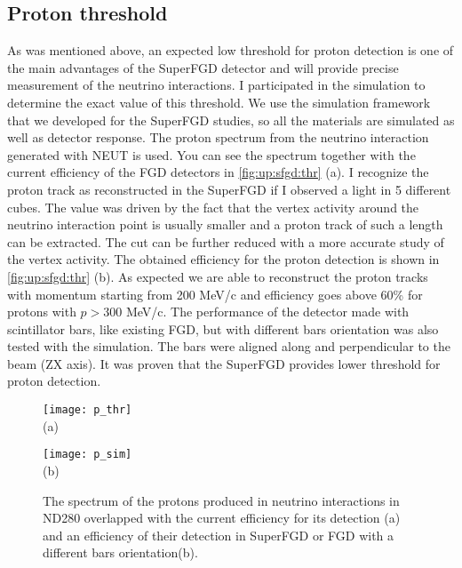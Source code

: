 \documentclass[main.tex]{subfiles}
\begin{document}
\subsection{Proton threshold}
\label{sec:up:sfgd:thr}
As was mentioned above, an expected low threshold for proton detection is one of the main advantages of the SuperFGD detector and will provide precise measurement of the neutrino interactions. I participated in the simulation to determine the exact value of this threshold. We use the simulation framework that we developed for the SuperFGD studies, so all the materials are simulated as well as detector response. The proton spectrum from the neutrino interaction generated with NEUT is used. You can see the spectrum together with the current efficiency of the FGD detectors in \autoref{fig:up:sfgd:thr} (a). I recognize the proton track as reconstructed in the SuperFGD if I observed a light in 5 different cubes. The value was driven by the fact that the vertex activity around the neutrino interaction point is usually smaller and a proton track of such a length can be extracted. The cut can be further reduced with a more accurate study of the vertex activity. The obtained efficiency for the proton detection is shown in \autoref{fig:up:sfgd:thr} (b). As expected we are able to reconstruct the proton tracks with momentum starting from 200 MeV/c and efficiency goes above 60\% for protons with $p>300$ MeV/c. The performance of the detector made with scintillator bars, like existing FGD, but with different bars orientation was also tested with the simulation. The bars were aligned along and perpendicular to the beam (ZX axis). It was proven that the SuperFGD provides lower threshold for proton detection.

\begin{figure}[!ht]
	\centering
  \begin{minipage}{0.49\linewidth}
    \centering
    \texttt{[image: p\_thr]} \\ (a)
  \end{minipage}
  \begin{minipage}{0.49\linewidth}
    \centering
    \texttt{[image: p\_sim]} \\ (b)
  \end{minipage}
  \caption{The spectrum of the protons produced in neutrino interactions in ND280 overlapped with the current efficiency for its detection (a)  and an efficiency of their detection in  SuperFGD or FGD with a different bars orientation(b).}
  \label{fig:up:sfgd:thr}
\end{figure}
\end{document}
